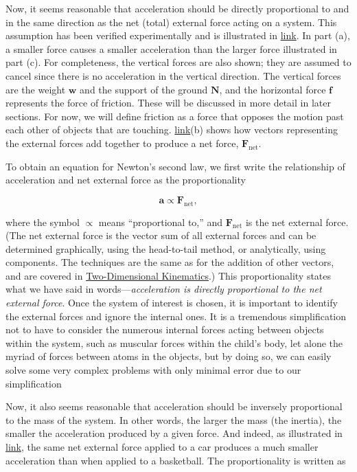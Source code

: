\documentclass[
]{book}
\begin{document}
Now, it seems reasonable that acceleration should be directly
proportional to and in the same direction as the net (total) external
force acting on a system. This assumption has been verified
experimentally and is illustrated in
\protect\hyperlink{import-auto-id1993910}{link}. In part (a), a
smaller force causes a smaller acceleration than the larger force
illustrated in part (c). For completeness, the vertical forces are also
shown; they are assumed to cancel since there is no acceleration in the
vertical direction. The vertical forces are the weight \(\textbf{w}{}\)
and the support of the ground \(\textbf{N}{}\), and the horizontal force
\(\textbf{f}{}\) represents the force of friction. These will be discussed
in more detail in later sections. For now, we will define
\protect\hypertarget{import-auto-id2639388}{}{friction} as a force that
opposes the motion past each other of objects that are touching.
\protect\hyperlink{import-auto-id1993910}{link}(b) shows how
vectors representing the external forces add together to produce a net
force, \(\textbf{F}_{\text{net}}{}\).

To obtain an equation for Newton's second law, we first write the
relationship of acceleration and net external force as the
proportionality

\leavevmode\hypertarget{eip-id1450972}{}%
\[{\textbf{a}{\propto}\textbf{F}_{\text{net}},}{}\]

where the symbol \(\propto\) means ``proportional to,'' and
\(\textbf{F}_{\text{net}}{}\) is the \protect\hypertarget{import-auto-id1890102}{}{net external
force}. (The net external force
is the vector sum of all external forces and can be determined
graphically, using the head-to-tail method, or analytically, using
components. The techniques are the same as for the addition of other
vectors, and are covered in \href{/m54779}{Two-Dimensional Kinematics}.) This
proportionality states what we have said in words---\emph{acceleration is
directly proportional to the net external force}. Once the system of
interest is chosen, it is important to identify the external forces and
ignore the internal ones. It is a tremendous simplification not to have
to consider the numerous internal forces acting between objects within
the system, such as muscular forces within the child's body, let alone
the myriad of forces between atoms in the objects, but by doing so, we
can easily solve some very complex problems with only minimal error due
to our simplification

Now, it also seems reasonable that acceleration should be inversely
proportional to the mass of the system. In other words, the larger the
mass (the inertia), the smaller the acceleration produced by a given
force. And indeed, as illustrated in
\protect\hyperlink{import-auto-id1375143}{link}, the same net
external force applied to a car produces a much smaller acceleration
than when applied to a basketball. The proportionality is written as
\end{document}
